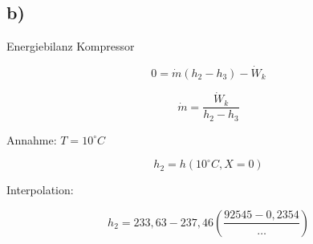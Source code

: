 

\subsection*{b)}

Energiebilanz Kompressor

\[
0 = \dot{m} (h_2 - h_3) - \dot{W}_k
\]

\[
\dot{m} = \frac{\dot{W}_k}{h_2 - h_3}
\]

Annahme: $T = 10^\circ C$

\[
h_2 = h(10^\circ C, X=0)
\]

Interpolation:

\[
h_2 = 233,63 - 237,46 \left( \frac{92545 - 0,2354}{\dots} \right)
\]